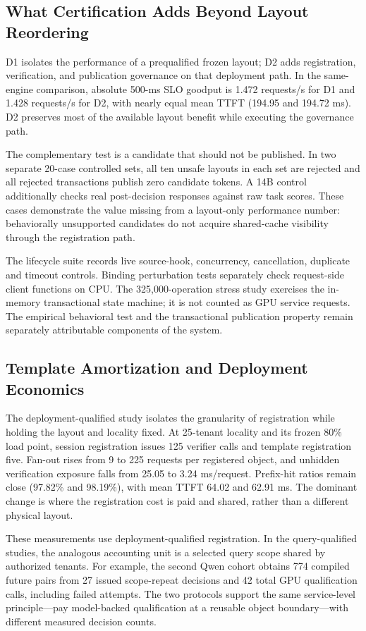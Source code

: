 \subsection{What Certification Adds Beyond Layout Reordering}
\label{sec:ablation}
D1 isolates the performance of a prequalified frozen layout; D2 adds registration, verification, and publication governance on that deployment path. In the same-engine comparison, absolute 500-ms SLO goodput is 1.472 requests/s for D1 and 1.428 requests/s for D2, with nearly equal mean TTFT (194.95 and 194.72 ms). D2 preserves most of the available layout benefit while executing the governance path.

The complementary test is a candidate that should not be published. In two separate 20-case controlled sets, all ten unsafe layouts in each set are rejected and all rejected transactions publish zero candidate tokens. A 14B control additionally checks real post-decision responses against raw task scores. These cases demonstrate the value missing from a layout-only performance number: behaviorally unsupported candidates do not acquire shared-cache visibility through the registration path.

The lifecycle suite records live source-hook, concurrency, cancellation, duplicate and timeout controls. Binding perturbation tests separately check request-side client functions on CPU. The 325,000-operation stress study exercises the in-memory transactional state machine; it is not counted as GPU service requests. The empirical behavioral test and the transactional publication property remain separately attributable components of the system.

\subsection{Template Amortization and Deployment Economics}
\label{sec:deployment}
The deployment-qualified study isolates the granularity of registration while holding the layout and locality fixed. At 25-tenant locality and its frozen 80\% load point, session registration issues 125 verifier calls and template registration five. Fan-out rises from 9 to 225 requests per registered object, and unhidden verification exposure falls from 25.05 to 3.24 ms/request. Prefix-hit ratios remain close (97.82\% and 98.19\%), with mean TTFT 64.02 and 62.91 ms. The dominant change is where the registration cost is paid and shared, rather than a different physical layout.

These measurements use deployment-qualified registration. In the query-qualified studies, the analogous accounting unit is a selected query scope shared by authorized tenants. For example, the second Qwen cohort obtains 774 compiled future pairs from 27 issued scope-repeat decisions and 42 total GPU qualification calls, including failed attempts. The two protocols support the same service-level principle---pay model-backed qualification at a reusable object boundary---with different measured decision counts.

